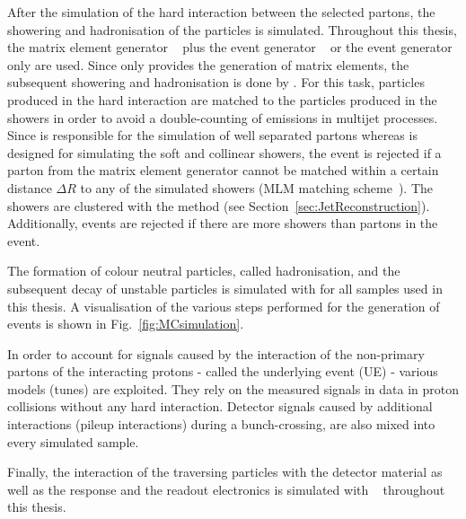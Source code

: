 After the simulation of the hard interaction between the selected partons, the showering and hadronisation of the particles is simulated.
Throughout this thesis, the matrix element generator \madgraph~\cite{bib:Madgraph_2014} plus the event generator \pythia~\cite{bib:Pyhtia6_2006} or the event generator \pythia only are used.
Since \madgraph only provides the generation of matrix elements, the subsequent showering and hadronisation is done by \pythia.
For this task, particles produced in the hard interaction are matched to the particles produced in the showers in order to avoid a double-counting of emissions in multijet processes.
Since \madgraph is responsible for the simulation of well separated partons whereas \pythia is designed for simulating the soft and collinear showers, the event is rejected if a parton from the matrix element generator cannot be matched within a certain distance $\Delta R$ to any of the simulated showers (MLM matching scheme~\cite{bib:MLM_matching}).
The showers are clustered with the \kt method (see Section~\ref{sec:JetReconstruction}).
Additionally, events are rejected if there are more showers than partons in the event.

The formation of colour neutral particles, called hadronisation, and the subsequent decay of unstable particles is simulated with \pythia for all samples used in this thesis.
A visualisation of the various steps performed for the generation of events is shown in Fig.~\ref{fig:MCsimulation}. 

In order to account for signals caused by the interaction of the non-primary partons of the interacting protons - called the underlying event (UE) -  various models (tunes) are exploited.
They rely on the measured signals in data in proton collisions without any hard interaction.
Detector signals caused by additional interactions (pileup interactions) during a bunch-crossing, are also mixed into every simulated sample.

Finally, the interaction of the traversing particles with the detector material as well as the response and the readout electronics is simulated with \geant~\cite{bib:Geant4_2003,bib:Geant4_2006} throughout this thesis.


